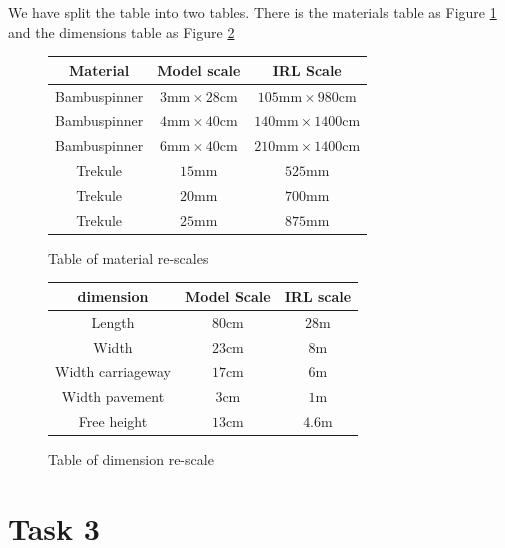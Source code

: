 \documentclass{report}
\begin{document}
We have split the table into two tables. There is the materials table as Figure \ref{fig:tomr} and the dimensions table as Figure \ref{fig:todr}

\begin{figure}[H]
	\centering
	\begin{tabular}{|c|c|c|}
		\hline
		Material     & Model scale                          & IRL Scale                                \\
		\hline
		Bambuspinner & $3\mathrm{mm} \times 28 \mathrm{cm}$ & $105\mathrm{mm} \times 980 \mathrm{cm}$  \\
		Bambuspinner & $4\mathrm{mm} \times 40 \mathrm{cm}$ & $140\mathrm{mm} \times 1400 \mathrm{cm}$ \\
		Bambuspinner & $6\mathrm{mm} \times 40 \mathrm{cm}$ & $210\mathrm{mm} \times 1400 \mathrm{cm}$ \\
		Trekule      & $15\mathrm{mm}$                      & $525\mathrm{mm}$                         \\
		Trekule      & $20\mathrm{mm}$                      & $700\mathrm{mm}$                         \\
		Trekule      & $25\mathrm{mm}$                      & $875\mathrm{mm}$                         \\
		\hline
	\end{tabular}
	\caption{Table of material re-scales}
	\label{fig:tomr}
\end{figure}

\begin{figure}[H]
	\centering

	\begin{tabular}{|c|c|c|}
		\hline
		dimension         & Model Scale      & IRL scale      \\
		\hline
		Length            & $80 \mathrm{cm}$ & $28 \mathrm m$ \\
		Width             & $23 \mathrm{cm}$ & $8\mathrm m$   \\
		Width carriageway & $17 \mathrm{cm}$ & $6\mathrm m$   \\
		Width pavement    & $3  \mathrm{cm}$ & $1\mathrm m$   \\
		Free height       & $13 \mathrm{cm}$ & $4.6\mathrm m$ \\
		\hline
	\end{tabular}

	\caption{Table of dimension re-scale}
	\label{fig:todr}
\end{figure}

\section{Task 3}
\end{document}

